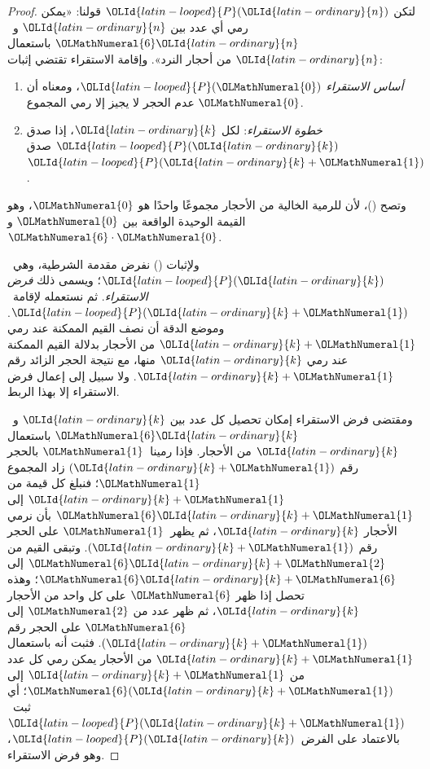\documentclass[../../../include/open-logic-section]{subfiles}
\begin{document}
\begin{proof}
لتكن ${\OLId{latin-looped}{P}}({\OLId{latin-ordinary}{n}})$ قولنا: «يمكن رمي أي عدد بين ${\OLId{latin-ordinary}{n}}$ و~${\OLMathNumeral{6}}{\OLId{latin-ordinary}{n}}$ باستعمال ${\OLId{latin-ordinary}{n}}$ من
أحجار النرد». وإقامة الاستقراء تقتضي إثبات:
\begin{enumerate}
\item \emph{أساس الاستقراء} ${\OLId{latin-looped}{P}}({\OLMathNumeral{0}})$، ومعناه أن عدم الحجر لا يجيز إلا
  رمي المجموع ${\OLMathNumeral{0}}$.
\item \emph{خطوة الاستقراء}: لكل ${\OLId{latin-ordinary}{k}}$، إذا صدق ${\OLId{latin-looped}{P}}({\OLId{latin-ordinary}{k}})$ صدق~${\OLId{latin-looped}{P}}({\OLId{latin-ordinary}{k}}+{\OLMathNumeral{1}})$.
\end{enumerate}

وتصح ()، لأن للرمية الخالية من الأحجار مجموعًا واحدًا هو ${\OLMathNumeral{0}}$، وهو
القيمة الوحيدة الواقعة بين ${\OLMathNumeral{0}}$ و~${\OLMathNumeral{6}}\cdot{\OLMathNumeral{0}}$.

ولإثبات () نفرض مقدمة الشرطية، وهي~${\OLId{latin-looped}{P}}({\OLId{latin-ordinary}{k}})$؛ ويسمى ذلك
\emph{فرض الاستقراء}. ثم نستعمله لإقامة~${\OLId{latin-looped}{P}}({\OLId{latin-ordinary}{k}}+{\OLMathNumeral{1}})$. وموضع الدقة أن
نصف القيم الممكنة عند رمي ${\OLId{latin-ordinary}{k}}+{\OLMathNumeral{1}}$ من الأحجار بدلالة القيم الممكنة عند
رمي ${\OLId{latin-ordinary}{k}}$ منها، مع نتيجة الحجر الزائد رقم ${\OLId{latin-ordinary}{k}}+{\OLMathNumeral{1}}$. ولا سبيل إلى إعمال
فرض الاستقراء إلا بهذا الربط.

ومقتضى فرض الاستقراء إمكان تحصيل كل عدد بين ${\OLId{latin-ordinary}{k}}$ و~${\OLMathNumeral{6}}{\OLId{latin-ordinary}{k}}$ باستعمال
${\OLId{latin-ordinary}{k}}$ من الأحجار. فإذا رمينا~${\OLMathNumeral{1}}$ بالحجر رقم $({\OLId{latin-ordinary}{k}}+{\OLMathNumeral{1}})$ زاد المجموع ${\OLMathNumeral{1}}$؛
فنبلغ كل قيمة من ${\OLId{latin-ordinary}{k}}+{\OLMathNumeral{1}}$ إلى ${\OLMathNumeral{6}}{\OLId{latin-ordinary}{k}}+{\OLMathNumeral{1}}$ بأن نرمي الأحجار ${\OLId{latin-ordinary}{k}}$، ثم يظهر~${\OLMathNumeral{1}}$
على الحجر رقم $({\OLId{latin-ordinary}{k}}+{\OLMathNumeral{1}})$. وتبقى القيم من ${\OLMathNumeral{6}}{\OLId{latin-ordinary}{k}}+{\OLMathNumeral{2}}$ إلى ${\OLMathNumeral{6}}{\OLId{latin-ordinary}{k}}+{\OLMathNumeral{6}}$؛ وهذه تحصل
إذا ظهر ${\OLMathNumeral{6}}$ على كل واحد من الأحجار ${\OLId{latin-ordinary}{k}}$، ثم ظهر عدد من ${\OLMathNumeral{2}}$ إلى ${\OLMathNumeral{6}}$
على الحجر رقم $({\OLId{latin-ordinary}{k}}+{\OLMathNumeral{1}})$. فثبت أنه باستعمال ${\OLId{latin-ordinary}{k}}+{\OLMathNumeral{1}}$ من الأحجار يمكن رمي
كل عدد من ${\OLId{latin-ordinary}{k}}+{\OLMathNumeral{1}}$ إلى ${\OLMathNumeral{6}}({\OLId{latin-ordinary}{k}}+{\OLMathNumeral{1}})$؛ أي ثبت~${\OLId{latin-looped}{P}}({\OLId{latin-ordinary}{k}}+{\OLMathNumeral{1}})$ بالاعتماد على
الفرض~${\OLId{latin-looped}{P}}({\OLId{latin-ordinary}{k}})$، وهو فرض الاستقراء.
\end{proof}
\end{document}
